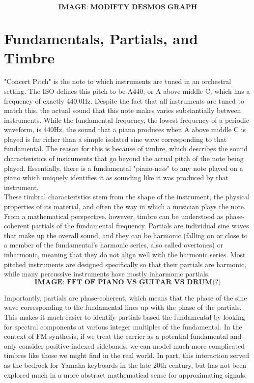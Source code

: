 \documentclass[11pt,twoside]{report}
\numberwithin{thm}{section}
\numberwithin{equation}{section}
\begin{document}
$$\textbf{IMAGE: MODIFTY DESMOS GRAPH}$$

\section{Fundamentals, Partials, and Timbre}
"Concert Pitch" is the note to which instruments are tuned in an orchestral setting. The ISO defines this pitch to be A440, or A above middle C, which has a frequency of exactly 440.0Hz. Despite the fact that all instruments are tuned to match this, the actual sound that this note makes varies substantially between instruments. While the fundamental frequency, the lowest frequency of a periodic waveform, is 440Hz, the sound that a piano produces when A above middle C is played is far richer than a simple isolated sine wave corresponding to that fundamental. The reason for this is because of timbre, which describes the sound characteristics of instruments that go beyond the actual pitch of the note being played. Essentially, there is a fundamental "piano-ness" to any note played on a piano which uniquely identifies it as sounding like it was produced by that instrument. \\

These timbral characteristics stem from the shape of the instrument, the physical properties of its material, and often the way in which a musician plays the note. From a mathematical perspective, however, timbre can be understood as phase-coherent partials of the fundamental frequency. Partials are individual sine waves that make up the overall sound, and they can be harmonic (falling on or close to a member of the fundamental's harmonic series, also called overtones) or inharmonic, meaning that they do not align well with the harmonic series. Most pitched instruments are designed specifically so that their partials are harmonic, while many percussive instruments have mostly inharmonic partials. \\

$$\textbf{IMAGE: FFT OF PIANO VS GUITAR VS DRUM(?)}$$

Importantly, partials are phase-coherent, which means that the phase of the sine wave corresponding to the fundamental lines up with the phase of the partials. This makes it much easier to identify partials based the fundamental by looking for spectral components at various integer multiples of the fundamental. In the context of FM synthesis, if we treat the carrier as a potential fundamental and only consider positive-indexed sidebands, we can model much more complicated timbres like those we might find in the real world. In part, this interaction served as the bedrock for Yamaha keyboards in the late 20th century, but has not been explored much in a more abstract mathematical sense for approximating signals.\\
\end{document}
